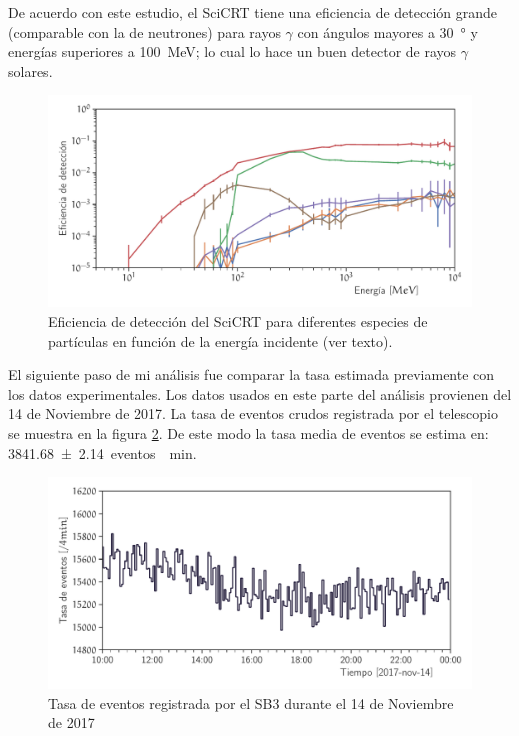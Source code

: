 De acuerdo con este estudio, el SciCRT tiene una eficiencia de detección grande (comparable con la de neutrones) para rayos $\gamma$ con ángulos mayores a \SI{30}{\degree} y energías superiores a \SI{100}{\mega\electronvolt}; lo cual lo hace un buen detector de rayos $\gamma$ solares.

\begin{figure}
        \centering
        \includegraphics[width=\textwidth]{scibar-efficiency.pdf}
        \caption{Eficiencia de detección del SciCRT para diferentes especies de partículas en función de la energía incidente (ver texto).}
        \label{fig:total-efficiency}
\end{figure}

El siguiente paso de mi análisis fue comparar la tasa estimada previamente con los datos experimentales. Los datos usados en este parte del análisis provienen del \num{14} de Noviembre de \num{2017}. La tasa de eventos crudos registrada por el telescopio se muestra en la figura \ref{fig:neutron-1pix}. De este modo la tasa media de eventos se estima en: \SI{3841.68(214)}{eventos \per\minute}.

\begin{figure}
        \centering
        \includegraphics[width=\textwidth]{neutron-171114-1pix.pdf}
        \caption{Tasa de eventos registrada por el SB3 durante el \num{14} de Noviembre de \num{2017}}
        \label{fig:neutron-1pix}
\end{figure}


